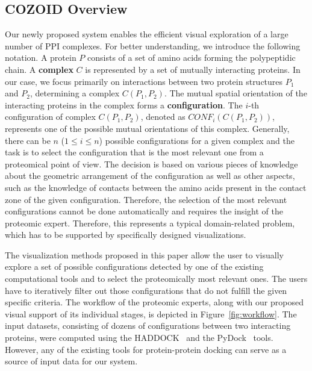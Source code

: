 \documentclass{bmcart}
\begin{document}
\subsection*{COZOID Overview}
Our newly proposed system enables the efficient visual exploration of a large number of PPI complexes.
For better understanding, we introduce the following notation.
A protein $P$ consists of a set of amino acids forming the polypeptidic chain.
A \textbf{complex} $C$ is represented by a set of mutually interacting proteins.
In our case, we focus primarily on interactions between two protein structures $P_1$ and $P_2$, determining a complex $C(P_1,P_2)$.
The mutual spatial orientation of the interacting proteins in the complex forms a \textbf{configuration}.
The $i$-th configuration of complex $C(P_1,P_2)$, denoted as $CONF_i(C(P_1,P_2))$, represents one of the possible mutual orientations of this complex.
Generally, there can be $n$ ($1 \leq i \leq n$) possible configurations for a given complex and the task is to select the configuration that is the most relevant one from a proteomical point of view.
The decision is based on various pieces of knowledge about the geometric arrangement of the configuration as well as other aspects, such as the knowledge of contacts between the amino acids present in the contact zone of the given configuration.
Therefore, the selection of the most relevant configurations cannot be done automatically and requires the insight of the proteomic expert.
Therefore, this represents a typical domain-related problem, which has to be supported by specifically designed visualizations.

The visualization methods proposed in this paper allow the user to visually explore a set of possible configurations detected by one of the existing computational tools and to select the proteomically most relevant ones.
The users have to iteratively filter out those configurations that do not fulfill the given specific criteria.
The workflow of the proteomic experts, along with our proposed visual support of its individual stages, is depicted in Figure~\ref{fig:workflow}.
The input datasets, consisting of dozens of configurations between two interacting proteins, were computed using the HADDOCK~\cite{haddock} and the PyDock~\cite{pydock} tools. 
However, any of the existing tools for protein-protein docking can serve as a source of input data for our system.
\end{document}
